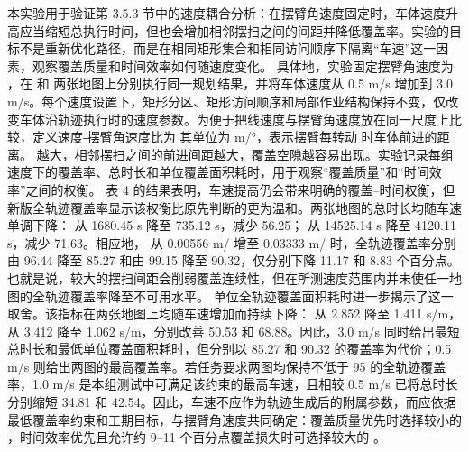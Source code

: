 {}本实验用于验证第 3.5.3 节中的速度耦合分析：在摆臂角速度固定时，车体速度升高应当缩短总执行时间，但也会增加相邻摆扫之间的间距并降低覆盖率。实验的目标不是重新优化路径，而是在相同矩形集合和相同访问顺序下隔离“车速”这一因素，观察覆盖质量和时间效率如何随速度变化。\markdownRendererParagraphSeparator
{}具体地，实验固定摆臂角速度为 ，在  和  两张地图上分别执行同一规划结果，并将车体速度从 0.5 m/s 增加到 3.0 m/s。每个速度设置下，矩形分区、矩形访问顺序和局部作业结构保持不变，仅改变车体沿轨迹执行时的速度参数。为便于把线速度与摆臂角速度放在同一尺度上比较，定义速度-摆臂角速度比为\markdownRendererParagraphSeparator
{}\markdownRendererParagraphSeparator
{}其单位为 m/°，表示摆臂每转动  时车体前进的距离。\markdownRendererInlineMath{\rho} 越大，相邻摆扫之间的前进间距越大，覆盖空隙越容易出现。实验记录每组速度下的覆盖率、总时长和单位覆盖面积耗时，用于观察“覆盖质量”和“时间效率”之间的权衡。\markdownRendererParagraphSeparator
{}\markdownRendererParagraphSeparator
{}表 4 的结果表明，车速提高仍会带来明确的覆盖--时间权衡，但新版全轨迹覆盖率显示该权衡比原先判断的更为温和。两张地图的总时长均随车速单调下降： 从 1680.45 s 降至 735.12 s，减少 56.25\markdownRendererPercentSign{}； 从 14525.14 s 降至 4120.11 s，减少 71.63\markdownRendererPercentSign{}。相应地，\markdownRendererInlineMath{\rho} 从 0.00556 m/\markdownRendererInlineMath{^\circ} 增至 0.03333 m/\markdownRendererInlineMath{^\circ} 时，全轨迹覆盖率分别由 96.44\markdownRendererPercentSign{} 降至 85.27\markdownRendererPercentSign{} 和由 99.15\markdownRendererPercentSign{} 降至 90.32\markdownRendererPercentSign{}，仅分别下降 11.17 和 8.83 个百分点。也就是说，较大的摆扫间距会削弱覆盖连续性，但在所测速度范围内并未使任一地图的全轨迹覆盖率降至不可用水平。\markdownRendererParagraphSeparator
{}单位全轨迹覆盖面积耗时进一步揭示了这一取舍。该指标在两张地图上均随车速增加而持续下降： 从 2.852 降至 1.411 s/m， 从 3.412 降至 1.062 s/m，分别改善 50.53\markdownRendererPercentSign{} 和 68.88\markdownRendererPercentSign{}。因此，3.0 m/s 同时给出最短总时长和最低单位覆盖面积耗时，但分别以 85.27\markdownRendererPercentSign{} 和 90.32\markdownRendererPercentSign{} 的覆盖率为代价；0.5 m/s 则给出两图的最高覆盖率。若任务要求两图均保持不低于 95\markdownRendererPercentSign{} 的全轨迹覆盖率，1.0 m/s 是本组测试中可满足该约束的最高车速，且相较 0.5 m/s 已将总时长分别缩短 34.81\markdownRendererPercentSign{} 和 42.54\markdownRendererPercentSign{}。因此，车速不应作为轨迹生成后的附属参数，而应依据最低覆盖率约束和工期目标，与摆臂角速度共同确定：覆盖质量优先时选择较小的 \markdownRendererInlineMath{\rho}，时间效率优先且允许约 9--11 个百分点覆盖损失时可选择较大的 \markdownRendererInlineMath{\rho}。\markdownRendererParagraphSeparator
